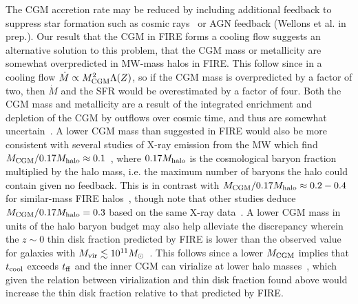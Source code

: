 \documentclass[fleqn,usenatbib]{mnras}
\newcommand{\Mdot}{\dot{M}}
\begin{document}
The CGM accretion rate may be reduced by including additional feedback to suppress star formation such as cosmic rays~\citep{Chan2019, Hopkins2020, Hopkins2020a, Hopkins2020b}
or AGN feedback (Wellons et al. in prep.). 
Our result that the CGM in FIRE forms a cooling flow suggests an alternative solution to this problem, that the CGM mass or metallicity are somewhat overpredicted in MW-mass halos in FIRE.
This follow since in a cooling flow $\Mdot\propto M_{\rm CGM}^2 \Lambda(Z)$, so if the CGM mass is overpredicted by a factor of two, then $\Mdot$ and the SFR would be overestimated by a factor of four.
Both the CGM mass and metallicity are a result of the integrated enrichment and depletion of the CGM by outflows over cosmic time, and thus are somewhat uncertain~\citep{Kelly2021}.
A lower CGM mass than suggested in FIRE would also be more consistent with several studies of X-ray emission from the MW which find $M_{\rm CGM}/0.17M_{\rm halo} \approx 0.1$~\citep[][]{Faerman2017, Li2018, Bregman2018}, where $0.17 M_{\rm halo}$ is the cosmological baryon fraction multiplied by the halo mass, i.e. the maximum number of baryons the halo could contain given no feedback.
This is in contrast with $M_{\rm CGM}/0.17M_{\rm halo} \approx 0.2-0.4$ for similar-mass FIRE halos~\citep{Hafen2019}, though note that other studies deduce $M_{\rm CGM}/0.17M_{\rm halo}=0.3$ based on the same X-ray data~\citep{Faerman2019}.
A lower CGM mass in units of the halo baryon budget may also help alleviate the discrepancy wherein the $z\sim0$ thin disk fraction predicted by FIRE is lower than the observed value for galaxies with $M_{\rm vir} \lesssim 10^{11} M_\odot$~\citep{El-Badry2018, Peebles2020, Stern2020}.
This follows since a lower $M_{\rm CGM}$ implies that $t_{\rm cool}$ exceeds $t_{\rm ff}$ and the inner CGM can virialize at lower halo masses~\citep{Stern2020}, which given the relation between virialization and thin disk fraction found above would increase the thin disk fraction relative to that predicted by FIRE. 
\end{document}
